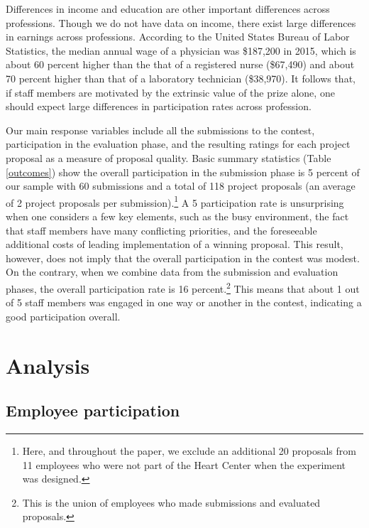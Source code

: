 \documentclass[11pt]{article}
\begin{document}
Differences in income and education are other important differences
across professions. Though we do not have data on income, there exist
large differences in earnings across professions. According to the
United States Bureau of Labor Statistics, the median annual wage of a
physician was \$187,200 in 2015, which is about 60 percent higher than
the that of a registered nurse (\$67,490) and about 70 percent higher
than that of a laboratory technician (\$38,970). It follows that, if
staff members are motivated by the extrinsic value of the prize alone,
one should expect large differences in participation rates across
profession.



Our main response variables include all the submissions to the contest,
participation in the evaluation phase, and the resulting ratings for
each project proposal as a measure of proposal quality. Basic summary
statistics (Table \ref{outcomes}) show the overall participation in the
submission phase is 5 percent of our sample with 60 submissions and a
total of 118 project proposals (an average of 2 project proposals per
submission).\footnote{Here, and throughout the paper, we exclude an
  additional 20 proposals from 11 employees who were not part of the
  Heart Center when the experiment was designed.} A 5 participation rate
is unsurprising when one considers a few key elements, such as the busy
environment, the fact that staff members have many conflicting
priorities, and the foreseeable additional costs of leading
implementation of a winning proposal. This result, however, does not
imply that the overall participation in the contest was modest. On the
contrary, when we combine data from the submission and evaluation
phases, the overall participation rate is 16 percent.\footnote{This is
  the union of employees who made submissions and evaluated proposals.}
This means that about 1 out of 5 staff members was engaged in one way or
another in the contest, indicating a good participation overall.

\section{Analysis}\label{analysis}

\subsection{Employee participation}\label{employee-participation}
\end{document}
